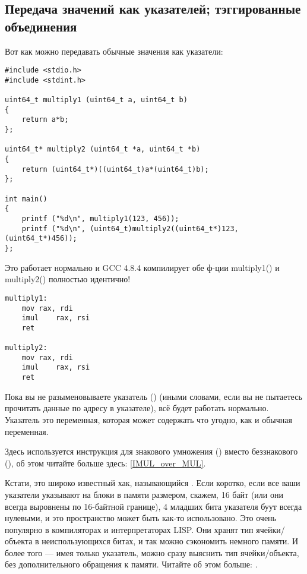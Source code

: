 \subsection{Передача значений как указателей; тэггированные объединения}

Вот как можно передавать обычные значения как указатели:

\begin{lstlisting}[label=unsigned_multiply_C,style=customc]
#include <stdio.h>
#include <stdint.h>

uint64_t multiply1 (uint64_t a, uint64_t b)
{
	return a*b;
};

uint64_t* multiply2 (uint64_t *a, uint64_t *b)
{
	return (uint64_t*)((uint64_t)a*(uint64_t)b);
};

int main()
{
	printf ("%d\n", multiply1(123, 456));
	printf ("%d\n", (uint64_t)multiply2((uint64_t*)123, (uint64_t*)456));
};
\end{lstlisting}

Это работает нормально и GCC 4.8.4 компилирует обе ф-ции multiply1() и multiply2() полностью идентично!

\begin{lstlisting}[label=unsigned_multiply_lst,style=customasmx86]
multiply1:
	mov	rax, rdi
	imul	rax, rsi
	ret

multiply2:
	mov	rax, rdi
	imul	rax, rsi
	ret
\end{lstlisting}

Пока вы не разыменовываете указатель () (иными словами, если вы не пытаетесь прочитать данные
по адресу в указателе), всё будет работать нормально.
Указатель это переменная, которая может содержать что угодно, как и обычная переменная.

Здесь используется инструкция для знакового умножения (\IMUL) вместо беззнакового (\MUL), об этом читайте больше здесь:
\ref{IMUL_over_MUL}.

Кстати, это широко известный хак, называющийся .
Если коротко, если все ваши указатели указывают на блоки в памяти размером, скажем, 16 байт (или они всегда
выровнены по 16-байтной границе), 4 младших бита указателя буут всегда нулевыми, и это пространство может быть
как-то использовано.
Это очень популярно в компиляторах и интерпретаторах LISP.
Они хранят тип ячейки/объекта в неиспользующихся битах, и так можно сэкономить немного памяти.
И более того --- имея только указатель, можно сразу выяснить тип ячейки/объекта, без дополнительного обращения к памяти.
Читайте об этом больше: .


